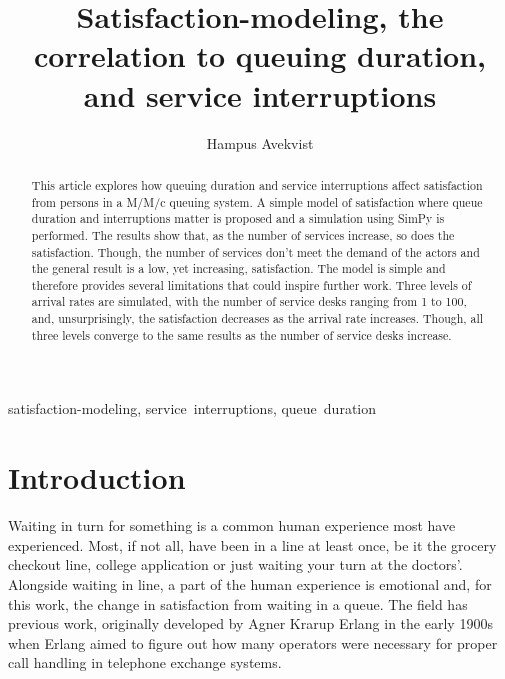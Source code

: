 \documentclass[conference]{IEEEtran}
\begin{document}
\title{
    Satisfaction-modeling, the correlation to queuing duration, and
    service interruptions
}

\author{
    Hampus Avekvist \\
}

\maketitle

\begin{abstract}
    This article explores how queuing duration and service
    interruptions affect satisfaction from persons in a M/M/c
    queuing system. A simple model of satisfaction where queue
    duration and interruptions matter is proposed and a simulation
    using SimPy is performed. The results show that, as the number
    of services increase, so does the satisfaction. Though, the
    number of services don't meet the demand of the actors and the
    general result is a low, yet increasing, satisfaction. The
    model is simple and therefore provides several limitations that
    could inspire further work. Three levels of arrival rates are
    simulated, with the number of service desks ranging from 1 to
    100, and, unsurprisingly, the satisfaction decreases as the
    arrival rate increases. Though, all three levels converge to
    the same results as the number of service desks increase.
\end{abstract}

\begin{IEEEkeywords}
    satisfaction-modeling, service~interruptions, queue~duration
\end{IEEEkeywords}

\section{Introduction}

Waiting in turn for something is a common human experience most
have experienced. Most, if not all, have been in a line at least
once, be it the grocery checkout line, college application or
just waiting your turn at the doctors'. Alongside waiting in line,
a part of the human experience is emotional
\cite{NeuroLaunchMakingSomeoneWait} and, for this work, the change
in satisfaction from waiting in a queue. The field has previous
work, originally developed by Agner Krarup Erlang
\cite{ErlangSandsynlighedsregning} in the early 1900s when Erlang
aimed to figure out how many operators were necessary for proper
call handling in telephone exchange systems.
\end{document}
